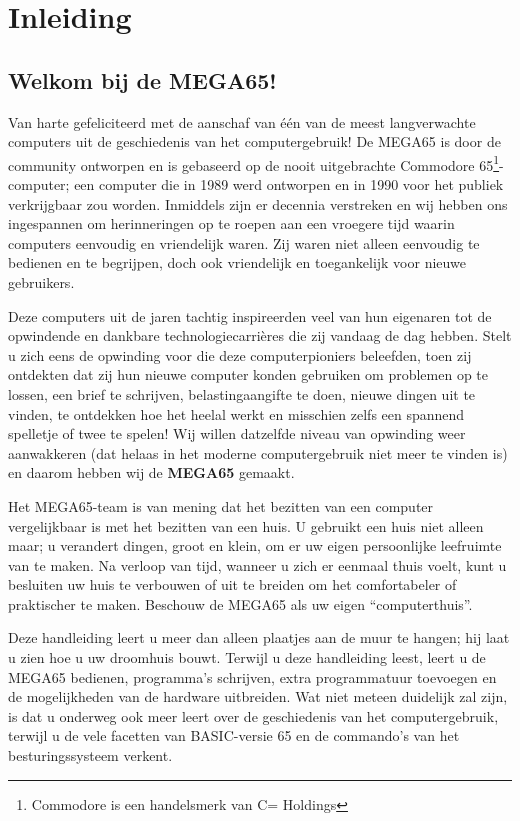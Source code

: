 \chapter{Inleiding}


\section{Welkom bij de MEGA65!}

Van harte gefeliciteerd met de aanschaf van één van de meest langverwachte computers uit de geschiedenis van het computergebruik! De MEGA65 is door de community ontworpen en is gebaseerd op de nooit uitgebrachte Commodore{\textregistered} 65\footnote{Commodore is een handelsmerk van C= Holdings}-computer; een computer die in 1989 werd ontworpen en in 1990 voor het publiek verkrijgbaar zou worden. Inmiddels zijn er decennia verstreken en wij hebben ons ingespannen om herinneringen op te roepen aan een vroegere tijd waarin computers eenvoudig en vriendelijk waren. Zij waren niet alleen eenvoudig te bedienen en te begrijpen, doch ook vriendelijk en toegankelijk voor nieuwe gebruikers.

Deze computers uit de jaren tachtig inspireerden veel van hun eigenaren tot de opwindende en dankbare technologiecarrières die zij vandaag de dag hebben. Stelt u zich eens de opwinding voor die deze computerpioniers beleefden, toen zij ontdekten dat zij hun nieuwe computer konden gebruiken om problemen op te lossen, een brief te schrijven, belastingaangifte te doen, nieuwe dingen uit te vinden, te ontdekken hoe het heelal werkt en misschien zelfs een spannend spelletje of twee te spelen! Wij willen datzelfde niveau van opwinding weer aanwakkeren (dat helaas in het moderne computergebruik niet meer te vinden is) en daarom hebben wij de {\bf MEGA65} gemaakt.

Het MEGA65-team is van mening dat het bezitten van een computer vergelijkbaar is met het bezitten van een huis. U gebruikt een huis niet alleen maar; u verandert dingen, groot en klein, om er uw eigen persoonlijke leefruimte van te maken. Na verloop van tijd, wanneer u zich er eenmaal thuis voelt, kunt u besluiten uw huis te verbouwen of uit te breiden om het comfortabeler of praktischer te maken. Beschouw de MEGA65 als uw eigen ``computerthuis''.

Deze handleiding leert u meer dan alleen plaatjes aan de muur te hangen; hij laat u zien hoe u uw droomhuis bouwt. Terwijl u deze handleiding leest, leert u de MEGA65 bedienen, programma's schrijven, extra programmatuur toevoegen en de mogelijkheden van de hardware uitbreiden. Wat niet meteen duidelijk zal zijn, is dat u onderweg ook meer leert over de geschiedenis van het computergebruik, terwijl u de vele facetten van BASIC-versie 65 en de commando's van het besturingssysteem verkent.

